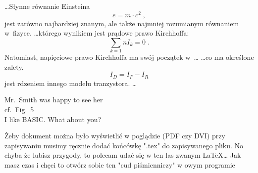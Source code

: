 \documentclass{article}
\begin{document}
\ldots Słynne równanie Einsteina
\begin{equation}
e = m \cdot c^2 \; ,
\end{equation}
jest zarówno najbardziej znanym, ale także
najmniej rozumianym równaniem w~fizyce.
\ldots którego wynikiem jest prądowe prawo Kirchhoffa:
\begin{equation}
\sum_{k=1}{n} I_k = 0 \; .
\end{equation}
Natomiast, napięciowe prawo Kirchhoffa ma
swój początek w~\ldots
\ldots co ma określone zalety.
\begin{equation}
I_D = I_F - I_R
\end{equation}
jest rdzeniem innego modelu tranzystora. \ldots
\newline
\newline



Mr.~Smith was happy to see her\\
cf.~Fig.~5\\
I like BASIC\@. What about you?



Żeby dokument można było wyświetlić w poglądzie (PDF czy DVI)
przy zapisywaniu musimy ręcznie dodać końcówkę ".tex" do zapisywanego pliku.\newline
No chyba że lubisz przygody, to polecam udać się w ten las zwanym LaTeX\ldots
\newline
\newline
Jak masz czas i chęci to otwórz sobie ten "cud piśmienniczy" w owym programie
\end{document}
